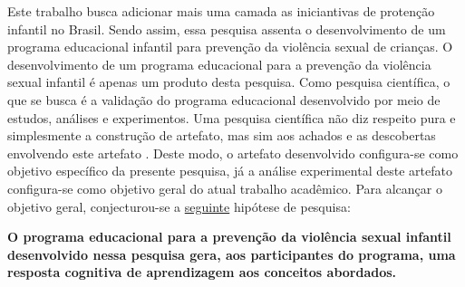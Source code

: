 Este trabalho busca adicionar mais uma camada as iniciantivas de protenção infantil no Brasil. Sendo assim, essa pesquisa assenta o desenvolvimento de um programa educacional infantil para prevenção da violência sexual de crianças. O desenvolvimento de um programa educacional para a prevenção da violência sexual infantil é apenas um produto desta pesquisa. Como pesquisa científica, o que se busca é a validação do programa educacional desenvolvido por meio de estudos, análises e experimentos. Uma pesquisa científica não diz respeito pura e simplesmente a construção de artefato, mas sim aos achados e as descobertas envolvendo este artefato \cite{wazlawick2014metodologia}. Deste modo, o artefato desenvolvido configura-se como objetivo específico da presente pesquisa, já a análise experimental deste artefato configura-se como objetivo geral do atual trabalho acadêmico. Para alcançar o objetivo geral, conjecturou-se a \hyperref[hipotese]{seguinte} hipótese de pesquisa: 


\vspace{0.6cm}

\vspace{-0.6cm}
\begin{framed}
  \textbf{O programa educacional para a prevenção da violência sexual infantil desenvolvido nessa pesquisa gera, aos participantes do programa, uma resposta cognitiva de aprendizagem aos conceitos abordados.} 
\end{framed}

